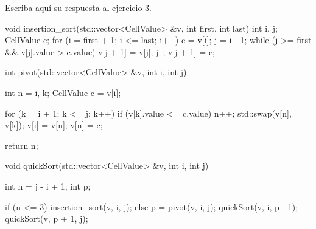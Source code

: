 Escriba aquí su respuesta al ejercicio 3.

\begin{lslisting}
void insertion_sort(std::vector<CellValue> &v, int first, int last)
{
    int i, j;
    CellValue c;
    for (i = first + 1; i <= last; i++)
    {
        c = v[i];
        j = i - 1;
        while (j >= first && v[j].value > c.value)
        {
            v[j + 1] = v[j];
            j--;
        }
        v[j + 1] = c;
    }
}

int pivot(std::vector<CellValue> &v, int i, int j)
{
    int n = i, k;
    CellValue c = v[i];

    for (k = i + 1; k <= j; k++)
        if (v[k].value <= c.value)
        {
            n++;
            std::swap(v[n], v[k]);
        }
    v[i] = v[n];
    v[n] = c;

    return n;
}

void quickSort(std::vector<CellValue> &v, int i, int j)
{
    int n = j - i + 1;
    int p;

    if (n <= 3)
        insertion_sort(v, i, j);
    else
    {
        p = pivot(v, i, j);
        quickSort(v, i, p - 1);
        quickSort(v, p + 1, j);
    }
}
\end{lslisting}